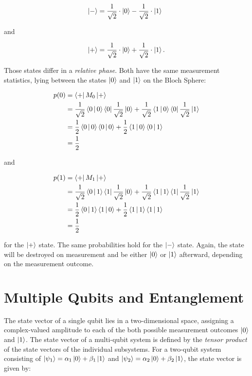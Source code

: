 \begin{equation}
  \Ket{-} = \frac{1}{\sqrt{2}} \cdot \Ket{0} - \frac{1}{\sqrt{2}} \cdot \Ket{1} \phantom{.}
\end{equation}

and

\begin{equation}
  \Ket{+} = \frac{1}{\sqrt{2}} \cdot \Ket{0} + \frac{1}{\sqrt{2}} \cdot \Ket{1}.
\end{equation}

Those states differ in a \textit{relative phase}. Both have the same measurement statistics, lying between the states $\Ket{0}$ and
$\Ket{1}$ on the Bloch Sphere:

\begin{align}
  p(0) &= \Bra{+} M_0 \Ket{+} \\
       &= \frac{1}{\sqrt{2}} \Braket{0|0} \Bra{0} \frac{1}{\sqrt{2}} \Ket{0} + \frac{1}{\sqrt{2}} \Braket{1|0} \Bra{0} \frac{1}{\sqrt{2}} \Ket{1} \\
       &= \frac{1}{2} \Braket{0|0} \Braket{0|0} + \frac{1}{2} \Braket{1|0} \Braket{0|1} \\
       &= \frac{1}{2}
\end{align}


and

\begin{align}
  p(1) &= \Bra{+} M_1 \Ket{+} \\
       &= \frac{1}{\sqrt{2}} \Braket{0|1} \Bra{1} \frac{1}{\sqrt{2}} \Ket{0} + \frac{1}{\sqrt{2}} \Braket{1|1} \Bra{1} \frac{1}{\sqrt{2}} \Ket{1} \\
       &= \frac{1}{2} \Braket{0|1} \Braket{1|0} + \frac{1}{2} \Braket{1|1} \Braket{1|1} \\
       &= \frac{1}{2}
\end{align}



for the $\Ket{+}$ state. The same probabilities hold for the
$\Ket{-}$ state.
Again, the state will be destroyed on measurement and be either $\Ket{0}$ or $\Ket{1}$ afterward, depending on the measurement outcome.

\section{Multiple Qubits and Entanglement}

The state vector of a single qubit lies in a two-dimensional 
space, assigning a complex-valued amplitude to each of the both possible measurement outcomes
$\Ket{0}$ and $\Ket{1}$. The state vector of a multi-qubit system is defined by
the \textit{tensor product} of the state vectors of the individual subsystems.
For a two-qubit system consisting of $\Ket{\psi_1} = \alpha_1 \Ket{0} + \beta_1
\Ket{1}$ and $\Ket{\psi_2} = \alpha_2 \Ket{0} + \beta_2 \Ket{1}$, the state vector
is given by:

